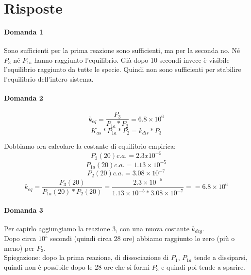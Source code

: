 \documentclass{article}
\begin{document}
\section{Risposte}
\paragraph{Domanda 1}
Sono sufficienti per la prima reazione sono sufficienti, ma per la seconda no. Né $P_3$ né $P_{1a}$ hanno raggiunto l'equilibrio. Già dopo 10 secondi invece è visibile l'equilibrio raggiunto da tutte le specie.
Quindi non sono sufficienti per stabilire l'equilibrio dell'intero sistema.
\paragraph{Domanda 2}
$$k_{eq} = \frac{ P_3}{P_{1a}*P_2} = 6.8 \times 10^6$$
$$K_{as}*P_{1a}*P_2 = k_{dis}*P_3$$

Dobbiamo ora calcolare la costante di equilibrio empirica:\\
$$P_3(20) c.a. = 2.3x10^{-5}$$
$$P_{1a}(20) c.a. = 1.13 \times 10^{-5}$$
$$P_2(20) c.a. = 3.08 \times 10^{-7}$$
$$k_{eq} = \frac{ P_3(20)}{P_{1a}(20)*P_2(20)} = \frac{2.3 \times 10^{-5}}{1.13 \times 10^{-5}*3.08 \times 10^{-7}} == 6.8 \times 10^{6}$$

\paragraph{Domanda 3}
Per capirlo aggiungiamo la reazione 3, con una nuova costante $k_{deg}$.\\
Dopo circa $10^5$ secondi (quindi circa 28 ore) abbiamo raggiunto lo zero (più o meno) per $P_3$.\\
Spiegazione: dopo la prima reazione, di dissociazione di $P_1$, $P_{1a}$ tende a dissiparsi, quindi non è possibile dopo le 28 ore che si formi $P_3$ e quindi poi tende a sparire.
\end{document}
